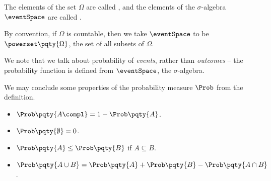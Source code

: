 \begin{definition}
    \label{def:outcome-event}%
    The elements of the set \(\Omega\) are called , and the elements of the \(\sigma\)-algebra \(\eventSpace\) are called .
\end{definition}

\begin{remark}
    By convention, if \(\Omega\) is countable, then we take \(\eventSpace\) to be \(\powerset\pqty{\Omega}\), the set of all subsets of \(\Omega\).
\end{remark}

We note that we talk about probability of \emph{events}, rather than \emph{outcomes} -- the probability function is defined from \(\eventSpace\), the \(\sigma\)-algebra.

We may conclude some properties of the probability measure \(\Prob\) from the definition.

\begin{proposition}
    \label{prop:properties-prob}%
    \begin{itemize}
        \item \(\Prob\pqty{A\compl} = 1 - \Prob\pqty{A}\).
        \item \(\Prob\pqty{\emptyset} = 0\).
        \item \(\Prob\pqty{A} \leq \Prob\pqty{B}\) if \(A \subseteq B\).
        \item \(\Prob\pqty{A \cup B} = \Prob\pqty{A} + \Prob\pqty{B} - \Prob\pqty{A \cap B}\).
    \end{itemize}
\end{proposition}